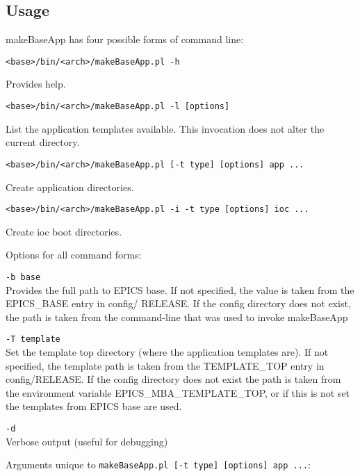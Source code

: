 \subsection{Usage}

makeBaseApp has four possible forms of command line:

\begin{verbatim}
<base>/bin/<arch>/makeBaseApp.pl -h
\end{verbatim}
Provides help.

\begin{verbatim}
<base>/bin/<arch>/makeBaseApp.pl -l [options]
\end{verbatim}
List the application templates available. This invocation does not alter the current directory.

\begin{verbatim}
<base>/bin/<arch>/makeBaseApp.pl [-t type] [options] app ... 
\end{verbatim}
Create application directories.

\begin{verbatim}
<base>/bin/<arch>/makeBaseApp.pl -i -t type [options] ioc ... 
\end{verbatim}
Create ioc boot directories.

Options for all command forms:

\begin{description}
\item \verb|-b base| \\
Provides the full path to EPICS base. If not specified, the value is taken from the EPICS\_BASE entry in config/
RELEASE. If the config directory does not exist, the path is taken from the command-line that was used to invoke 
makeBaseApp

\item \verb|-T template| \\
Set the template top directory (where the application templates are). If not specified, the template path is taken 
from the TEMPLATE\_TOP entry in config/RELEASE. If the config directory does not exist the path is taken from 
the environment variable EPICS\_MBA\_TEMPLATE\_TOP, or if this is not set the templates from EPICS base are 
used.

\item \verb|-d| \\
Verbose output (useful for debugging)
\end{description}

Arguments unique to \verb|makeBaseApp.pl [-t type] [options] app ...|:

